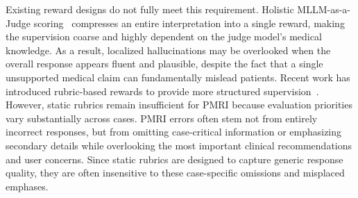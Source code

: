 \documentclass[letterpaper]{article} %
\begin{document}
Existing reward designs do not fully meet this requirement. Holistic MLLM-as-a-Judge scoring~\cite{zheng2023judging,chen2024mllm} compresses an entire interpretation into a single reward, making the supervision coarse and highly dependent on the judge model's medical knowledge. As a result, localized hallucinations may be overlooked when the overall response appears fluent and plausible, despite the fact that a single unsupported medical claim can fundamentally mislead patients. Recent work has introduced rubric-based rewards to provide more structured supervision~\cite{arora2025healthbench,gunjal2025rubrics}. However, static rubrics remain insufficient for PMRI because evaluation priorities vary substantially across cases. 
PMRI errors often stem not from entirely incorrect responses, but from omitting case-critical information or emphasizing secondary details while overlooking the most important clinical recommendations and user concerns. Since static rubrics are designed to capture generic response quality, they are often insensitive to these case-specific omissions and misplaced emphases.

\end{document}
